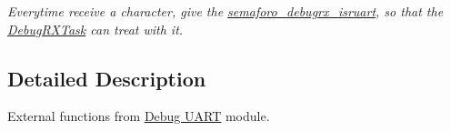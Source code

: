 \begin{DoxyCompactItemize}
\begin{DoxyCompactList}\small\item\em Everytime receive a character, give the \hyperlink{group___debug___private___variables_gaeefc3248920a99b9436147de4aeff800}{semaforo\+\_\+debugrx\+\_\+isruart}, so that the \hyperlink{group___debug___exported___functions___group2_ga8013ff117a9e96e630d30771cf9b0199}{Debug\+R\+X\+Task} can treat with it. \end{DoxyCompactList}\end{DoxyCompactItemize}


\subsection{Detailed Description}
External functions from \hyperlink{group___debug___uart}{Debug U\+A\+RT} module. 

